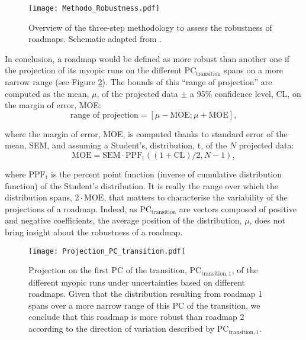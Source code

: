 \begin{figure}[!htbp]
\centering
\texttt{[image: Methodo\_Robustness.pdf]}
\caption{Overview of the three-step methodology to assess the robustness of roadmaps. Schematic adapted from \cite{moret2020overcapacity}.}
\label{fig:Methodo_Robustness}
\end{figure}

In conclusion, a roadmap would be defined as more robust than another one if the projection of its myopic runs on the different $\text{PC}_{\text{transition}}$ spans on a more narrow range (see Figure \ref{fig:Projection_PC_transition}). The bounds of this ``range of projection'' are computed as the mean, $\mu$, of the projected data $\pm$ a 95\% confidence level, CL, on the margin of error, MOE:
$$
\text{range of projection} = [\mu-\mathrm{MOE}; \mu + \mathrm{MOE}],
$$

\noindent
where the margin of error, MOE,  is computed thanks to standard error of the mean, SEM, and assuming a Student's, distribution, t,  of the $N$ projected data:
$$
\text{MOE} = \mathrm{SEM}\cdot \mathrm{PPF}_{\mathrm{t}}\left((1+\mathrm{CL})/2,N-1\right),
$$

\noindent
where $\mathrm{PPF}_{\mathrm{t}}$ is the percent point function (\ie inverse of cumulative distribution function) of the Student's distribution. It is really the range over which the distribution spans, $2\cdot \mathrm{MOE}$, that matters to characterise the variability of the projections of a roadmap. Indeed, as $\text{PC}_{\text{transition}}$ are vectors composed of positive and negative coefficients, the average position of the distribution, $\mu$, does not bring insight about the robustness of a roadmap.

\begin{figure}[!htbp]
\centering
\texttt{[image: Projection\_PC\_transition.pdf]}
\caption{Projection on the first PC of the transition, $\text{PC}_{\text{transition},1}$, of the different myopic runs under uncertainties based on different roadmaps. Given that the distribution resulting from roadmap 1 spans over a more narrow range of this PC of the transition, we conclude that this roadmap is more robust than roadmap 2 according to the direction of variation described by $\text{PC}_{\text{transition},1}$.}
\label{fig:Projection_PC_transition}
\end{figure}

